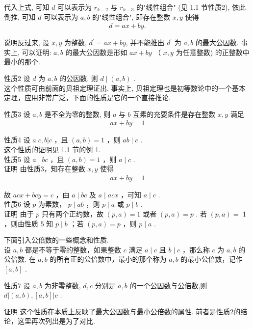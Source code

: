 代入上式, 可知 $d$ 可以表示为 $r_{k-2}$ 与 $r_{k-3}$ 的"线性组合" (见 1.1 节性质2), 依此倒推, 可知 $d$ 可以表示为 $a, b$ 的"线性组合", 即存在整数 $x, y$ 使得\\
\begin{align*}
d=a x+b y .
\end{align*}

说明反过来, 设 $x ,  y$ 为整数, $d^{\prime}=a x+b y$, 并不能推出 $d^{\prime}$ 为 $a ,  b$ 的最大公因数. 事实上, 可以证明: $a ,  b$ 的最大公因数是形如 $a x+b y$ （ $x, y$ 为任意整数) 的正整数中最小的那个.

性质2 设 $d$ 为 $a ,  b$ 的公因数, 则 $d \mid(a, b)$ . \\
这个性质可由前面的贝祖定理证出. 事实上, 贝祖定理也是初等数论中的一个基本定理，应用非常广泛，下面的性质是它的一个直接推论.

性质3 设 $a ,  b$ 是不全为零的整数, 则 $a$ 与 $b$ 互素的充要条件是存在整数 $x ,  y$ 满足\\
\begin{align*}
a x+b y=1
\end{align*}

性质4 设 $a|c, b| c$ ，且 $(a, b)=1$ ，则 $a b \mid c$ . \\
这个性质的证明见 1.1 节的例 1.\\
性质5 设 $a \mid b c$ ，且 $(a, b)=1$ ，则 $a \mid c$ . \\
证明 由性质3，知存在整数 $x, y$ 使得\\
\begin{align*}
a x+b y=1
\end{align*}

故 $a c x+b c y=c$ ，由 $a \mid b c$ 及 $a \mid a c x$ ，可知 $a \mid c$ . \\
性质6 设 $p$ 为素数， $p \mid a b$ ，则 $p \mid a$ 或 $p \mid b$ . \\
证明 由于 $p$ 只有两个正约数，故 $(p, a)=1$ 或者 $(p, a)=p$ . 若 $(p, a)=$ 1 ，则由性质 5 知 $p \mid b$ ；若 $(p, a)=p$ ，则 $p \mid a$ . 

下面引入公倍数的一些概念和性质. \\
设 $a ,  b$ 都是不等于零的整数，如果整数 $c$ 满足 $a \mid c$ 且 $b \mid c$ ，那么称 $c$ 为 $a ,  b$ 的公倍数. 在 $a ,  b$ 的所有正的公倍数中，最小的那个称为 $a ,  b$ 的最小公倍数，记作 $[a, b]$ . 

性质7 设 $a ,  b$ 为非零整数, $d ,  c$ 分别是 $a ,  b$ 的一个公因数与公倍数,则 $d|(a, b),[a, b]| c$ . 

证明 这个性质在本质上反映了最大公因数与最小公倍数的属性. 前者是性质2的结论，这里再次列出是为了对比. 

